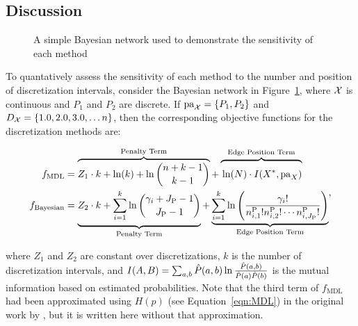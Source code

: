 \subsection{Discussion}
\label{subsec:discuss_exp}

\begin{figure}[ht]
  \centering
  
  \caption{A simple Bayesian network used to demonstrate the sensitivity of each method}
  \label{fig:exp_discuss}
\end{figure}

To quantatively assess the sensitivity of each method to the number and position of discretization intervals, consider the Bayesian network in Figure~\ref{fig:exp_discuss}, where $\mathcal{X}$ is continuous and $P_1$ and $P_2$ are discrete.
If $\Pa_{\cX} = \curly{P_1, P_2}$ and $D_{\cX} = \curly{1.0,2.0,3.0, \ldots n}$, then the corresponding objective functions for the discretization methods are:

\begin{small}
  \begin{equation}
  \begin{aligned}
  f_{\text{MDL}} & = \overbrace{Z_1 \cdot k + \ln(k) + \ln {{n +k - 1}\choose{k -1}} }^{\text{Penalty Term}}+   \overbrace{\rule{0pt}{1.35em} \ln(N) \cdot I(X^*, \Pa_X)}^{\text{Edge Position Term}} \\
  f_{\text{Bayesian}} &= \underbrace{{\vrule width0pt height0pt depth1.48em\relax}  Z_2 \cdot k + \sum_{i=1}^k \ln {{\gamma_i + J_\text{P} - 1}\choose{J_\text{P} -1}}}_{\text{Penalty Term}} + \underbrace{\sum^k_{i=1} \ln \left(   {{\gamma_i !}\over{n^{\text{P}}_{i,1}! n^{\text{P}}_{i,2}! \cdots n^{\text{P}}_{i,J_\text{P}}!    }} \right) }_{\text{Edge Position Term}}
  \end{aligned}\text{,}
  \end{equation}
\end{small}

\noindent
where $Z_1$ and $Z_2$ are constant over discretizations, $k$ is the number of discretization intervals, and $I\paren{A, B} = \sum_{a,b} \hat{P}(a,b) \ln\frac{\hat{P}(a,b)}{\hat{P}(a)\hat{P}(b)}$ is the mutual information based on estimated probabilities.
Note that the third term of $f_\text{MDL}$ had been approximated using $H(p)$ (see Equation~\ref{eqn:MDL}) in the original work by \cite{Friedman_1996}, but it is written here without that approximation.

